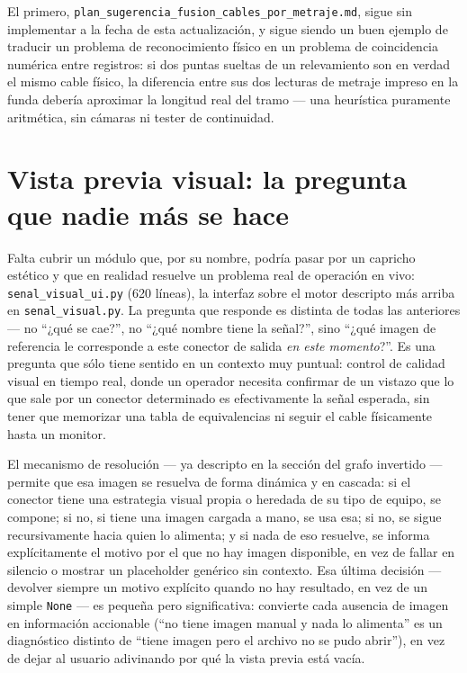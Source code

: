 \documentclass[11pt,twocolumn]{article}
\begin{document}
El primero, \texttt{plan\_sugerencia\_fusion\_cables\_por\_metraje.md}, sigue sin implementar a la fecha de esta actualización, y sigue siendo un buen ejemplo de traducir un problema de reconocimiento físico en un problema de coincidencia numérica entre registros: si dos puntas sueltas de un relevamiento son en verdad el mismo cable físico, la diferencia entre sus dos lecturas de metraje impreso en la funda debería aproximar la longitud real del tramo --- una heurística puramente aritmética, sin cámaras ni tester de continuidad.



\section{Vista previa visual: la pregunta que nadie más se hace}

Falta cubrir un módulo que, por su nombre, podría pasar por un capricho estético y que en realidad resuelve un problema real de operación en vivo: \texttt{senal\_visual\_ui.py} (620 líneas), la interfaz sobre el motor descripto más arriba en \texttt{senal\_visual.py}. La pregunta que responde es distinta de todas las anteriores --- no ``¿qué se cae?'', no ``¿qué nombre tiene la señal?'', sino ``¿qué imagen de referencia le corresponde a este conector de salida \emph{en este momento}?''. Es una pregunta que sólo tiene sentido en un contexto muy puntual: control de calidad visual en tiempo real, donde un operador necesita confirmar de un vistazo que lo que sale por un conector determinado es efectivamente la señal esperada, sin tener que memorizar una tabla de equivalencias ni seguir el cable físicamente hasta un monitor.

El mecanismo de resolución --- ya descripto en la sección del grafo invertido --- permite que esa imagen se resuelva de forma dinámica y en cascada: si el conector tiene una estrategia visual propia o heredada de su tipo de equipo, se compone; si no, si tiene una imagen cargada a mano, se usa esa; si no, se sigue recursivamente hacia quien lo alimenta; y si nada de eso resuelve, se informa explícitamente el motivo por el que no hay imagen disponible, en vez de fallar en silencio o mostrar un placeholder genérico sin contexto. Esa última decisión --- devolver siempre un motivo explícito quando no hay resultado, en vez de un simple \texttt{None} --- es pequeña pero significativa: convierte cada ausencia de imagen en información accionable (``no tiene imagen manual y nada lo alimenta'' es un diagnóstico distinto de ``tiene imagen pero el archivo no se pudo abrir''), en vez de dejar al usuario adivinando por qué la vista previa está vacía.
\end{document}
